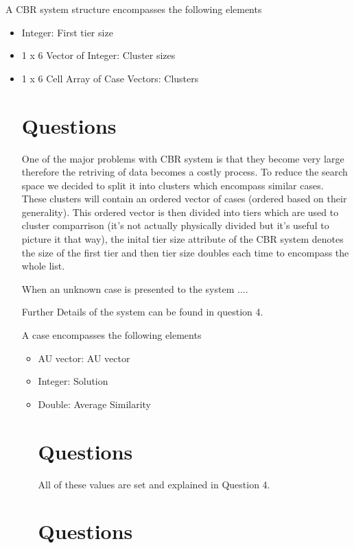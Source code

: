 \documentclass[11pt]{article}
\begin{document}
A CBR system structure encompasses the following elements 
\begin{itemize}
\item{Integer:                            First tier size}
\item{1 x 6 Vector of Integer:            Cluster sizes  }
\item{1 x 6 Cell Array of Case Vectors:   Clusters       }
\section{Questions}

One of the major problems with CBR system is that they become very large therefore the retriving of data becomes a costly process.
To reduce the search space we decided to split it into clusters which encompass similar cases. These clusters will contain an ordered vector of cases (ordered based on their generality). This ordered vector is then divided into tiers which are used to cluster comparrison (it's not actually physically divided but it's useful to picture it that way), the inital tier size attribute of the CBR system denotes the size of the first tier and then tier size doubles each time to encompass the whole list.

When an unknown case is presented to the system ....


Further Details of the system can be found in question 4.


A case encompasses the following elements
\begin{itemize}
\item{AU vector:   AU vector         }
\item{Integer:     Solution          }
\item{Double:      Average Similarity}
\section{Questions}

All of these values are set and explained in Question 4.

\section{Questions}


\end{itemize}
\end{itemize}
\end{document}

